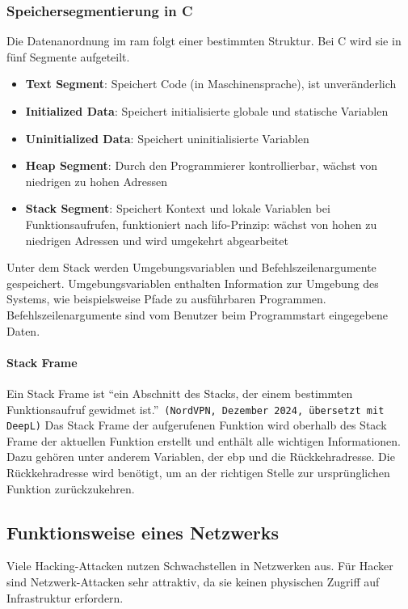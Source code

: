 \documentclass[11pt, a4paper]{article}
\begin{document}
\subsubsection{Speichersegmentierung in C}
Die Datenanordnung im \gls{ram} folgt einer bestimmten Struktur. Bei C wird sie in fünf Segmente aufgeteilt.
\begin{itemize}
	\item \textbf{Text Segment}: Speichert Code (in Maschinensprache), ist unveränderlich
	\item \textbf{Initialized Data}: Speichert initialisierte globale und statische Variablen
	\item \textbf{Uninitialized Data}: Speichert uninitialisierte Variablen
	\item \textbf{Heap Segment}: Durch den Programmierer kontrollierbar, wächst von niedrigen zu hohen Adressen~\cite{StackHeapYoutube:online}
	\item \textbf{Stack Segment}: Speichert Kontext und lokale Variablen bei Funktionsaufrufen, funktioniert nach \gls{lifo}-Prinzip: wächst von hohen zu niedrigen Adressen und wird umgekehrt abgearbeitet~\cite{StackHeapYoutube:online}
\end{itemize}
Unter dem Stack werden Umgebungsvariablen und Befehlszeilenargumente gespeichert. Umgebungsvariablen enthalten Information zur Umgebung des Systems, wie beispielsweise Pfade zu ausführbaren Programmen. ~\cite{UmgebungsMicrosoft:online} Befehlszeilenargumente sind vom Benutzer beim Programmstart eingegebene Daten.

\paragraph{Stack Frame}
Ein Stack Frame ist ``ein Abschnitt des Stacks, der einem bestimmten Funktionsaufruf gewidmet ist.''~\texttt{(NordVPN, Dezember 2024, übersetzt mit DeepL)}\cite{StackFrameNordVPN:online} Das Stack Frame der aufgerufenen Funktion wird oberhalb des Stack Frame der aktuellen Funktion erstellt und enthält alle wichtigen Informationen. Dazu gehören unter anderem Variablen, der \gls{ebp} und die Rückkehradresse. Die Rückkehradresse wird benötigt, um an der richtigen Stelle zur ursprünglichen Funktion zurückzukehren.

\subsection{Funktionsweise eines Netzwerks}
Viele Hacking-Attacken nutzen Schwachstellen in Netzwerken aus. Für Hacker sind Netzwerk-Attacken sehr attraktiv, da sie keinen physischen Zugriff auf Infrastruktur erfordern.
\end{document}
